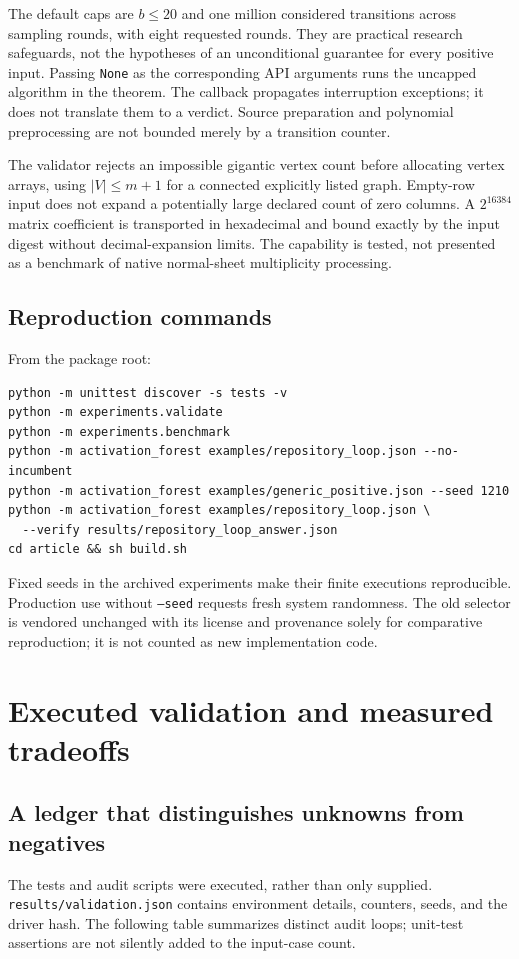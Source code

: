 \documentclass[11pt,letterpaper]{article}
\theoremstyle{definition}
\begin{document}
The default caps are $b\leq20$ and one million considered transitions across
sampling rounds, with eight requested rounds. They are practical research
safeguards, not the hypotheses of an unconditional guarantee for every
positive input. Passing \texttt{None} as the corresponding API arguments
runs the uncapped algorithm in the theorem. The callback propagates
interruption exceptions; it does not translate them to a verdict.
Source preparation and polynomial preprocessing are not bounded merely by
a transition counter.

The validator rejects an impossible gigantic vertex count before allocating
vertex arrays, using $|V|\leq m+1$ for a connected explicitly listed graph.
Empty-row input does not expand a potentially large declared count of zero
columns. A $2^{16384}$ matrix coefficient is transported in hexadecimal and
bound exactly by the input digest without decimal-expansion limits. The
capability is tested, not presented as a benchmark of native normal-sheet
multiplicity processing.

\subsection{Reproduction commands}
From the package root:
\begin{verbatim}
python -m unittest discover -s tests -v
python -m experiments.validate
python -m experiments.benchmark
python -m activation_forest examples/repository_loop.json --no-incumbent
python -m activation_forest examples/generic_positive.json --seed 1210
python -m activation_forest examples/repository_loop.json \
  --verify results/repository_loop_answer.json
cd article && sh build.sh
\end{verbatim}
Fixed seeds in the archived experiments make their finite executions
reproducible. Production use without \texttt{--seed} requests fresh system
randomness. The old selector is vendored unchanged with its license and
provenance solely for comparative reproduction; it is not counted as new
implementation code.

\section{Executed validation and measured tradeoffs}\label{sec:experiments}
\subsection{A ledger that distinguishes unknowns from negatives}
The tests and audit scripts were executed, rather than only supplied.
\texttt{results/validation.json} contains environment details, counters,
seeds, and the driver hash. The following table summarizes distinct audit
loops; unit-test assertions are not silently added to the input-case count.
\end{document}
